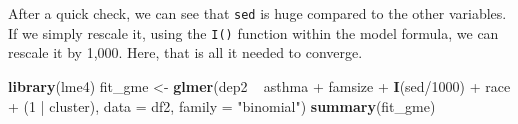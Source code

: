 \documentclass[]{tufte-book}
\newenvironment{Shaded}{}{}
\newcommand{\KeywordTok}[1]{\textcolor[rgb]{0.00,0.44,0.13}{\textbf{#1}}}
\newcommand{\DataTypeTok}[1]{\textcolor[rgb]{0.56,0.13,0.00}{#1}}
\newcommand{\DecValTok}[1]{\textcolor[rgb]{0.25,0.63,0.44}{#1}}
\newcommand{\StringTok}[1]{\textcolor[rgb]{0.25,0.44,0.63}{#1}}
\newcommand{\OperatorTok}[1]{\textcolor[rgb]{0.40,0.40,0.40}{#1}}
\newcommand{\NormalTok}[1]{#1}
\theoremstyle{definition}
\theoremstyle{definition}
\theoremstyle{remark}
\begin{document}
After a quick check, we can see that \texttt{sed} is huge compared to
the other variables. If we simply rescale it, using the \texttt{I()}
function within the model formula, we can rescale it by 1,000. Here,
that is all it needed to converge.

\begin{Shaded}
\begin{Highlighting}[]
\KeywordTok{library}\NormalTok{(lme4)}
\NormalTok{fit_gme <-}\StringTok{ }\KeywordTok{glmer}\NormalTok{(dep2 }\OperatorTok{~}\StringTok{ }\NormalTok{asthma }\OperatorTok{+}\StringTok{ }\NormalTok{famsize }\OperatorTok{+}\StringTok{ }\KeywordTok{I}\NormalTok{(sed}\OperatorTok{/}\DecValTok{1000}\NormalTok{) }\OperatorTok{+}\StringTok{ }
\StringTok{    }\NormalTok{race }\OperatorTok{+}\StringTok{ }\NormalTok{(}\DecValTok{1} \OperatorTok{|}\StringTok{ }\NormalTok{cluster), }\DataTypeTok{data =}\NormalTok{ df2, }\DataTypeTok{family =} \StringTok{"binomial"}\NormalTok{)}
\KeywordTok{summary}\NormalTok{(fit_gme)}
\end{Highlighting}
\end{Shaded}
\end{document}
